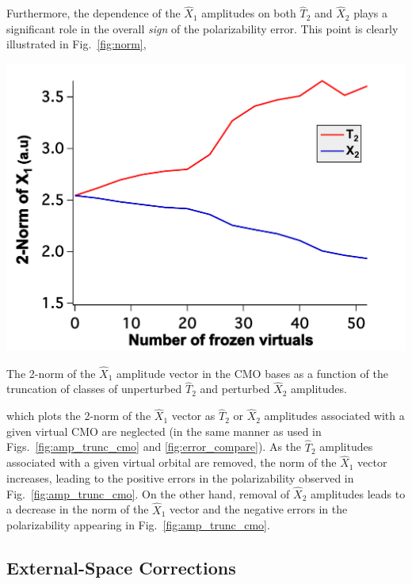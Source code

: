 Furthermore, the dependence of the $\hat{X}_1$ amplitudes on both $\hat{T}_2$
and $\hat{X}_2$ plays a significant role in the overall {\em sign} of the
polarizability error.  This point is clearly illustrated in
Fig.~\ref{fig:norm}, 
\begin{MyFigure}[h!]
\centering
\includegraphics[width=0.6\linewidth,natwidth=610,natheight=642]{figures_fvno/norm.pdf}
\caption{{\footnotesize The 2-norm of the $\hat{X}_1$ amplitude vector in
the CMO bases as a function of the truncation of classes of unperturbed
$\hat{T}_2$ and perturbed $\hat{X}_2$ amplitudes. }}
\label{fig:norm}
\end{MyFigure}
which plots the 2-norm of the $\hat{X}_1$ vector as
$\hat{T}_2$ or $\hat{X}_2$ amplitudes associated with a given virtual CMO are
neglected (in the same manner as used in Figs.~\ref{fig:amp_trunc_cmo} and
\ref{fig:error_compare}). As the $\hat{T}_2$ amplitudes associated with a given
virtual orbital are removed, the norm of the $\hat{X}_1$ vector
increases, leading to the positive errors in the polarizability observed in
Fig.~\ref{fig:amp_trunc_cmo}.  On the other hand, removal of $\hat{X}_2$
amplitudes leads to a decrease in the norm of the $\hat{X}_1$ vector and
the negative errors in the polarizability appearing in
Fig.~\ref{fig:amp_trunc_cmo}.

\subsection{External-Space Corrections}

